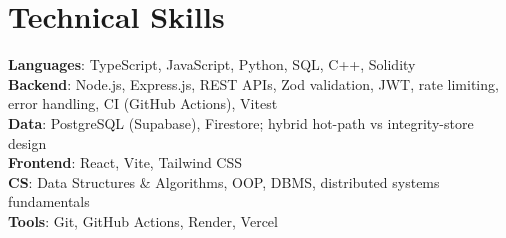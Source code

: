 \documentclass[letterpaper,11pt]{article}
\begin{document}
\section{Technical Skills}
  \begin{itemize}[leftmargin=0.15in, label={}]
    \small{\item{
      \textbf{Languages}{: TypeScript, JavaScript, Python, SQL, C++, Solidity} \\
      \textbf{Backend}{: Node.js, Express.js, REST APIs, Zod validation, JWT, rate limiting, error handling, CI (GitHub Actions), Vitest} \\
      \textbf{Data}{: PostgreSQL (Supabase), Firestore; hybrid hot-path vs integrity-store design} \\
      \textbf{Frontend}{: React, Vite, Tailwind CSS} \\
      \textbf{CS}{: Data Structures \& Algorithms, OOP, DBMS, distributed systems fundamentals} \\
      \textbf{Tools}{: Git, GitHub Actions, Render, Vercel}
    }}
  \end{itemize}
\end{document}
